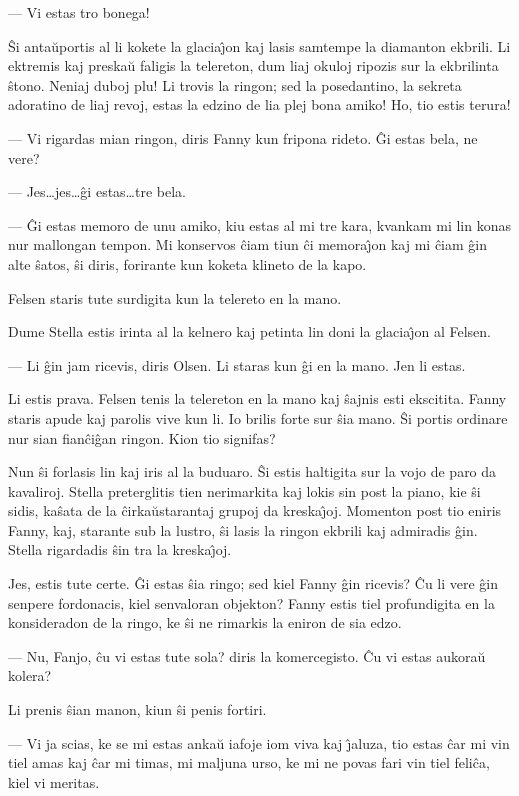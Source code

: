  --- Vi estas tro bonega!

   \^Si anta\u uportis al li kokete la glacia\^{\j}on kaj lasis samtempe la
diamanton ekbrili. Li ektremis kaj preska\u u faligis la telereton,
dum liaj okuloj ripozis sur la ekbrilinta \^stono. Neniaj duboj plu!
Li trovis la ringon; sed la posedantino, la sekreta adoratino de
liaj revoj, estas la edzino de lia plej bona amiko! Ho, tio estis
terura!

 --- Vi rigardas mian ringon, diris Fanny kun fripona rideto. \^Gi estas
bela, ne vere?

 --- Jes\dots jes\dots \^gi estas\dots tre bela.

 --- \^Gi estas memoro de unu amiko, kiu estas al mi tre kara, kvankam
mi lin konas nur mallongan tempon. Mi konservos \^ciam tiun \^ci
memora\^{\j}on kaj mi \^ciam \^gin alte \^satos, \^si diris,
forirante kun koketa klineto de la kapo.

   Felsen staris tute surdigita kun la telereto en la mano.

   Dume Stella estis irinta al la kelnero kaj petinta lin doni la
glacia\^{\j}on al Felsen.

 --- Li \^gin jam ricevis, diris Olsen. Li staras kun \^gi en la mano.
Jen li estas.

   Li estis prava. Felsen tenis la telereton en la mano kaj \^sajnis esti
ekscitita. Fanny staris apude kaj parolis vive kun li. Io brilis
forte sur \^sia mano. \^Si portis ordinare nur sian fian\^ci\^gan
ringon. Kion tio signifas?

   Nun \^si forlasis lin kaj iris al la buduaro. \^Si estis haltigita sur
la vojo de paro da kavaliroj. Stella preterglitis tien nerimarkita
kaj lokis sin post la piano, kie \^si sidis, ka\^sata de la
\^cirka\u ustarantaj grupoj da kreska\^{\j}oj. Momenton post tio
eniris Fanny, kaj, starante sub la lustro, \^si lasis la ringon
ekbrili kaj admiradis \^gin. Stella rigardadis \^sin tra la
kreska\^{\j}oj.

   Jes, estis tute certe. \^Gi estas \^sia ringo; sed kiel Fanny \^gin
ricevis? \^Cu li vere \^gin senpere fordonacis, kiel senvaloran
objekton? Fanny estis tiel profundigita en la konsideradon de la
ringo, ke \^si ne rimarkis la eniron de sia edzo.

 --- Nu, Fanjo, \^cu vi estas tute sola? diris la komercegisto. \^Cu vi
estas aukora\u u kolera?

   Li prenis \^sian manon, kiun \^si penis fortiri.

 --- Vi ja scias, ke se mi estas anka\u u iafoje iom viva kaj \^{\j}aluza,
tio estas \^car mi vin tiel amas kaj \^car mi timas, mi maljuna
urso, ke mi ne povas fari vin tiel feli\^ca, kiel vi meritas.

